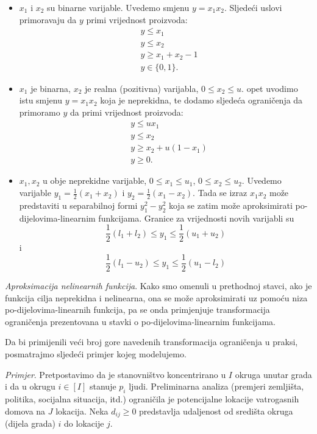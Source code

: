 \documentclass[a4paper, utf8, 11pt, colorlinks]{book}
\begin{document}
 \begin{itemize}
 	\item $x_1$ i $x_2$ su binarne varijable. Uvedemo smjenu $y=x_1 x_2$. Sljedeći uslovi primoravaju da $y$ primi vrijednost proizvoda:
 	  \begin{align*}
 		      &y \leq x_1 \\
 		      &y \leq x_2 \\
 		      & y \geq x_1 + x_2 - 1 \\
 		      & y \in \{0, 1\}.
 	  \end{align*}
   \item $x_1$ je binarna, $x_2$ je realna (pozitivna) varijabla, $0 \leq x_2 \leq u$. opet uvodimo istu smjenu $y= x_1 x_2$ koja je neprekidna, te dodamo sljedeća ograničenja da primoramo $y$ da primi vrijednost proizvoda:
    \begin{align*}
    	 &y \leq u x_1 \\
    	 &y \leq x_2 \\
    	 & y \geq x_2 + u(1-x_1) \\
    	 & y \geq 0.
    \end{align*}
  \item $x_1, x_2$ u obje neprekidne varijable, $0 \leq x_1 \leq u_1$, $0 \leq x_2 \leq u_2$. Uvedemo varijable $y_1 = \frac{1}{2}( x_1 + x_2) $ i  $y_2 =\frac{1}{2}(x_1 - x_2)$. Tada se izraz $x_1x_2$ može predstaviti u separabilnoj formi $y_1^2 - y_2^2$ koja se zatim može aproksimirati po-dijelovima-linearnim funkcijama. Granice za vrijednosti novih varijabli su 
  $$ \frac{1}{2}(l_1 + l_2) \leq y_1 \leq \frac{1}{2}(u_1 + u_2)$$ i 
  $$ \frac{1}{2}(l_1 - u_2) \leq y_1 \leq \frac{1}{2}(u_1 - l_2) $$
  
 \end{itemize} 

\emph{Aproksimacija nelinearnih funkcija}. Kako smo omenuli u prethodnoj stavci, ako je funkcija cilja neprekidna i nelinearna, ona se može aproksimirati uz pomoću niza po-dijelovima-linearnih funkcija, pa se onda primjenjuje transformacija ograničenja  prezentovana u stavki o po-dijelovima-linearnim funkcijama. 

Da bi primijenili veći broj gore navedenih transformacija ograničenja u praksi, posmatrajmo sljedeći primjer kojeg modelujemo. 


\emph{Primjer}. Pretpostavimo da je stanovništvo koncentrirano u $I$ okruga  unutar grada i da u okrugu $i\in [I]$ stanuje $p_i$ ljudi. Preliminarna analiza (premjeri zemljišta, politika, socijalna situacija, itd.) ograničila je potencijalne lokacije vatrogasnih domova na $J$ lokacija. Neka $d_{ij} \geq 0$ predstavlja udaljenost od središta okruga (dijela grada) $i$  do lokacije $j$. 
\end{document}
